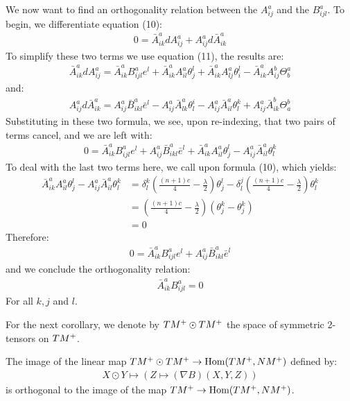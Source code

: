 We now want to find an orthogonality relation between the $A^a_{ij}$ and the $B^a_{ijl}$.  To begin, we differentiate equation (10):
%
\begin{align*}
0 = \bar{A}^a_{ik} d A^a_{ij} + A^a_{ij} d \bar{A}^a_{ik}
\end{align*}
%
To simplify these two terms we use equation (11), the results are:
%
\begin{align*}
\bar{A}^a_{ik} d A^a_{ij} = \bar{A}^a_{ik} B^a_{ijl} e^l + \bar{A}^a_{ik} A^a_{il} \theta^l_j + \bar{A}^a_{ik} A^a_{lj} \theta^l_i - \bar{A}^a_{ik} A^b_{ij} \Theta^a_b
\end{align*}
%
and:
%
\begin{align*}
A^a_{ij} d \bar{A}^a_{ik} = A^a_{ij} \bar{B}^a_{ikl} \bar{e}^l - A^a_{ij} \bar{A}^a_{lk} \theta^i_l - A^a_{ij} \bar{A}^a_{il} \theta^k_l + A^a_{ij} \bar{A}^b_{ik} \Theta^b_a
\end{align*}
%
Substituting in these two formula, we see, upon re-indexing, that two pairs of terms cancel, and we are left with:
%
\begin{align*}
0 = \bar{A}^a_{ik} B^a_{ijl} e^l + A^a_{ij} \bar{B}^a_{ikl} \bar{e}^l + \bar{A}^a_{ik} A^a_{il} \theta^l_j - A^a_{ij} \bar{A}^a_{il} \theta^k_l
\end{align*}
%
To deal with the last two terms here, we call upon formula (10), which yields:
%
\begin{align*}
\bar{A}^a_{ik} A^a_{il} \theta^l_j - A^a_{ij} \bar{A}^a_{il} \theta^k_l &= \delta^k_l \left( \frac{(n+1)c}{4} - \frac{\lambda}{2} \right) \theta^l_j - \delta^j_l \left( \frac{(n+1)c}{4} - \frac{\lambda}{2} \right) \theta^k_l \\
&= \left( \frac{(n+1)c}{4} - \frac{\lambda}{2} \right) \left( \theta^k_j - \theta^k_j \right) \\
&= 0
\end{align*}
%
Therefore:
%
\begin{align*}
0 = \bar{A}^a_{ik} B^a_{ijl} e^l + A^a_{ij} \bar{B}^a_{ikl} \bar{e}^l
\end{align*}
%
and we conclude the orthogonality relation:
%
\begin{align}
\bar{A}^a_{ik} B^a_{ijl} = 0
\end{align}
%
For all $k,j$ and $l$.

For the next corollary, we denote by $TM^{+} \odot TM^{+}$ the space of symmetric 2-tensors on $TM^{+}$.  

\begin{cor} The image of the linear map $TM^{+} \odot TM^{+} \rightarrow \text{Hom}( TM^{+}, NM^+ )$ defined by:
%
\begin{align*}
X \odot Y \mapsto ( Z \mapsto( \nabla B )( X, Y, Z ) )
\end{align*}
%
is orthogonal to the image of the map $TM^{+} \rightarrow \text{Hom}( TM^{+}, NM^+ )$. 
%
\end{cor}

